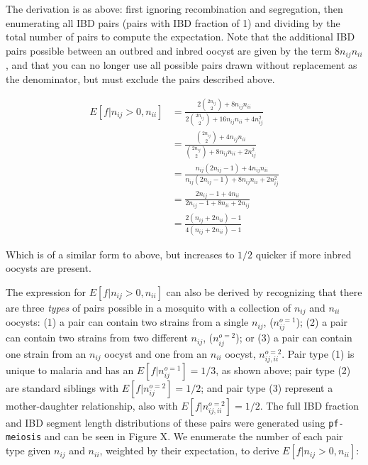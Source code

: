 \documentclass[9pt,lineno]{elife}
\begin{document}
The derivation is as above: first ignoring recombination and segregation, then enumerating all IBD pairs (pairs with IBD fraction of 1) and dividing by the total number of pairs to compute the expectation. Note that the additional IBD pairs possible between an outbred and inbred oocyst are given by the term $8n_{ij}n_{ii}$, and that you can no longer use all possible pairs drawn without replacement as the denominator, but must exclude the pairs described above.

\begin{equation} \label{eq2}
\begin{split}
E[f|n_{ij} > 0, n_{ii}] & = \frac{2{2n_{ij} \choose 2} + 8n_{ij}n_{ii}}{2{2n_{ij} \choose 2} + 16n_{ij}n_{ii} + 4n_{ij}^2} \\
& = \frac{{2n_{ij} \choose 2} + 4n_{ij}n_{ii}}{{2n_{ij} \choose 2} + 8n_{ij}n_{ii} + 2n_{ij}^2} \\
& = \frac{n_{ij}(2n_{ij} - 1) + 4n_{ij}n_{ii}}{n_{ij}(2n_{ij} - 1) + 8n_{ij}n_{ii} + 2n_{ij}^2} \\
& = \frac{2n_{ij} - 1 + 4n_{ii}}{2n_{ij} - 1 + 8n_{ii} + 2n_{ij}} \\
& = \frac{2(n_{ij} + 2n_{ii}) - 1}{4(n_{ij} + 2n_{ii}) - 1}
\end{split}
\end{equation}

Which is of a similar form to above, but increases to $1/2$ quicker if more inbred oocysts are present.

The expression for $E[f|n_{ij} > 0, n_{ii}]$ can also be derived by recognizing that there are three \textit{types} of pairs possible in a mosquito with a collection of $n_{ij}$ and $n_{ii}$ oocysts: (1) a pair can contain two strains from a single $n_{ij}$, ($n^{o=1}_{ij}$); (2) a pair can contain two strains from two different $n_{ij}$, ($n^{o=2}_{ij}$); or (3) a pair can contain one strain from an $n_{ij}$ oocyst and one from an $n_{ii}$ oocyst, $n^{o=2}_{ij, ii}$. Pair type (1) is unique to malaria and has an  $E[f|n^{o=1}_{ij}]=1/3$, as shown above; pair type (2) are standard siblings with $E[f|n^{o=2}_{ij}]=1/2$; and pair type (3) represent a mother-daughter relationship, also with $E[f|n^{o=2}_{ij, ii}]=1/2$. The full IBD fraction and IBD segment length distributions of these pairs were generated using \texttt{pf-meiosis} and can be seen in Figure X. We enumerate the number of each pair type given $n_{ij}$ and $n_{ii}$, weighted by their expectation, to derive $E[f|n_{ij} > 0, n_{ii}]$:
\end{document}
